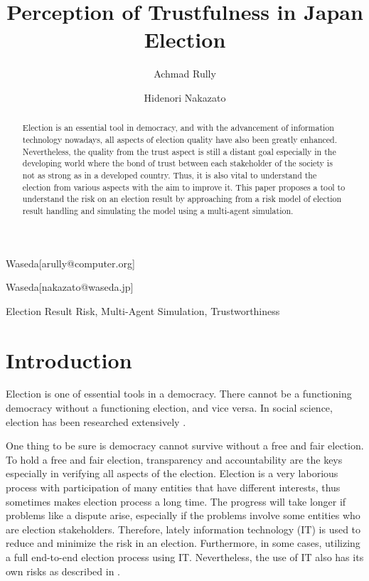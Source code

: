 \documentclass[JIP]{ipsj}
\begin{document}
\title{Perception of Trustfulness in Japan Election}


\author{Achmad Rully}{Waseda}[arully@computer.org]
\author{Hidenori Nakazato}{Waseda}[nakazato@waseda.jp]


\begin{abstract}
Election is an essential tool in democracy, and with the advancement of information technology nowadays, all aspects of election quality have also been greatly enhanced. Nevertheless, the quality from the trust aspect is still a distant goal especially in the developing world where the bond of trust between each stakeholder of the society is not as strong as in a developed country. Thus, it is also vital to understand the election from various aspects with the aim to improve it. This paper proposes a tool to understand the risk on an election result by approaching from a risk model of election result handling and simulating the model using a multi-agent simulation.
\end{abstract}

\begin{keyword}
Election Result Risk, Multi-Agent Simulation, Trustworthiness
\end{keyword}

\maketitle

\section{Introduction}

Election is one of essential tools in a democracy. There cannot be a functioning democracy without a functioning election, and vice versa. In social science, election has been researched extensively \cite{Manan2010}.

One thing to be sure is democracy cannot survive without a free and fair election. To hold a free and fair election, transparency and accountability are the keys especially in verifying all aspects of the election. Election is a very laborious process with participation of many entities that have different interests, thus sometimes makes election process a long time. The progress will take longer if problems like a dispute arise, especially if the problems involve some entities who are election stakeholders. Therefore, lately information technology (IT) is used to reduce and minimize the risk in an election. Furthermore, in some cases, utilizing a full end-to-end election process using IT. Nevertheless, the use of IT also has its own risks as described in \cite{Neumann1995}.
\end{document}
